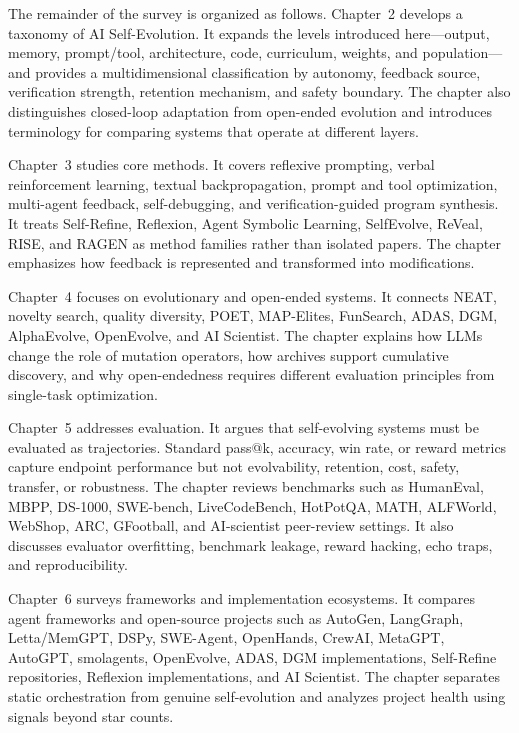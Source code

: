 The remainder of the survey is organized as follows. Chapter~2 develops a taxonomy of AI Self-Evolution. It expands the levels introduced here---output, memory, prompt/tool, architecture, code, curriculum, weights, and population---and provides a multidimensional classification by autonomy, feedback source, verification strength, retention mechanism, and safety boundary. The chapter also distinguishes closed-loop adaptation from open-ended evolution and introduces terminology for comparing systems that operate at different layers.

Chapter~3 studies core methods. It covers reflexive prompting, verbal reinforcement learning, textual backpropagation, prompt and tool optimization, multi-agent feedback, self-debugging, and verification-guided program synthesis. It treats Self-Refine, Reflexion, Agent Symbolic Learning, SelfEvolve, ReVeal, RISE, and RAGEN as method families rather than isolated papers. The chapter emphasizes how feedback is represented and transformed into modifications.

Chapter~4 focuses on evolutionary and open-ended systems. It connects NEAT, novelty search, quality diversity, POET, MAP-Elites, FunSearch, ADAS, DGM, AlphaEvolve, OpenEvolve, and AI Scientist. The chapter explains how LLMs change the role of mutation operators, how archives support cumulative discovery, and why open-endedness requires different evaluation principles from single-task optimization.

Chapter~5 addresses evaluation. It argues that self-evolving systems must be evaluated as trajectories. Standard pass@k, accuracy, win rate, or reward metrics capture endpoint performance but not evolvability, retention, cost, safety, transfer, or robustness. The chapter reviews benchmarks such as HumanEval, MBPP, DS-1000, SWE-bench, LiveCodeBench, HotPotQA, MATH, ALFWorld, WebShop, ARC, GFootball, and AI-scientist peer-review settings. It also discusses evaluator overfitting, benchmark leakage, reward hacking, echo traps, and reproducibility.

Chapter~6 surveys frameworks and implementation ecosystems. It compares agent frameworks and open-source projects such as AutoGen, LangGraph, Letta/MemGPT, DSPy, SWE-Agent, OpenHands, CrewAI, MetaGPT, AutoGPT, smolagents, OpenEvolve, ADAS, DGM implementations, Self-Refine repositories, Reflexion implementations, and AI Scientist. The chapter separates static orchestration from genuine self-evolution and analyzes project health using signals beyond star counts.

